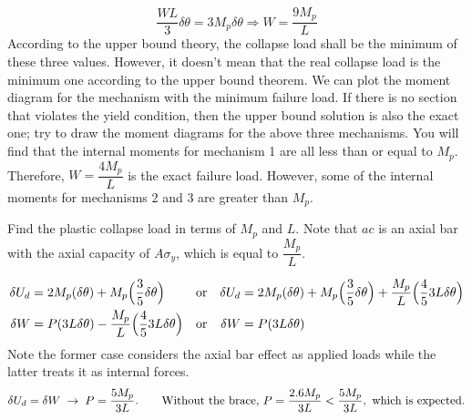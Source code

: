 \begin{example}
\begin{equation*}
  \frac{WL}{3}\delta\theta = 3M_p\delta\theta \Rightarrow W = \frac{9M_p}{L}
\end{equation*}
According to the upper bound theory, the collapse load shall be the minimum of these three values. However, it doesn't mean that the real collapse load is the minimum one according to the upper bound theorem. We can plot the moment diagram for the mechanism with the minimum failure load. If there is no section that violates the yield condition, then the upper bound solution is also the exact one; try to draw the moment diagrams for the above three mechanisms. You will find that the internal moments for mechanism 1 are all less than or equal to $M_p$. Therefore, $W = \dfrac{4M_p}{L}$ is the exact failure load. However, some of the internal moments for mechanisms 2 and 3 are greater than $M_p$.
\end{example}

\begin{example}
Find the plastic collapse load in terms of $M_p$ and $L$. Note that $ac$ is an axial bar with the axial capacity of $A\sigma_y$, which is equal to $\dfrac{M_p}{L}$.
\begin{fig}
  
\end{fig}
\begin{align*}
  \delta U_d &= 2M_p(\delta\theta) + M_p\Bigl(\frac35\delta\theta\Bigr) &&\text{or}& \delta U_d &= 2M_p(\delta\theta) + M_p\Bigl(\frac35\delta\theta\Bigr) + \frac{M_p}{L}\Bigl(\frac45 3L\delta\theta\Bigr)\\
  \delta W &= P(3L\delta\theta) - \frac{M_p}{L}\Bigl(\frac45 3L\delta\theta\Bigr) &&\text{or}& \delta W &= P(3L\delta\theta)
\end{align*}
Note the former case considers the axial bar effect as applied loads while the latter treats it as internal forces.
\begin{equation*}
  \delta U_d = \delta W \;\rightarrow\; P = \frac{5M_p}{3L}.\qquad\text{Without the brace, } P = \frac{2.6M_p}{3L} < \frac{5M_p}{3L},\text{ which is expected.}
\end{equation*}
\end{example}

